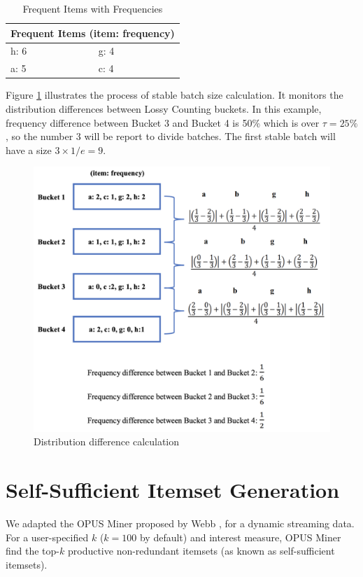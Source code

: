 \begin{table}[h!]
\caption{Frequent Items with Frequencies}
\label{tb:fq}
\centering
 \begin{tabular}{p{4cm} p{4cm}} 
 \hline\hline
 \multicolumn{2}{c}{Frequent Items (item: frequency)}\\
 \hline
 h: 6 & g: 4\\
 a: 5 & c: 4\\
 \hline
\end{tabular}
\end{table}

Figure \ref{fig:bsc} illustrates the process of stable batch size calculation. It monitors the distribution differences between Lossy Counting buckets. In this example, frequency difference between Bucket 3 and Bucket 4 is 50\% which is over $\tau = 25\%$, so the number 3 will be report to divide batches. The first stable batch will have a size $3 \times 1/e = 9$.

\begin{figure}[H]
\caption{Distribution difference calculation}
\label{fig:bsc}
\centering
\includegraphics[scale=0.5]{Methodology/bsc.png}
\end{figure}

\section{Self-Sufficient Itemset Generation}
We adapted the OPUS Miner proposed by Webb \cite{ssi}, for a dynamic streaming data. For a user-specified $k$ ($k=100$ by default) and interest measure, OPUS Miner find the top-$k$ productive non-redundant itemsets (as known as self-sufficient itemsets).

